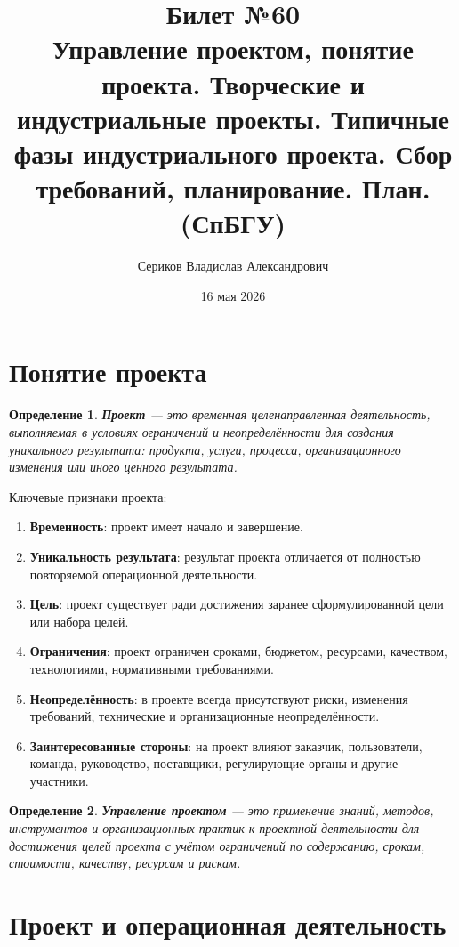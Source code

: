 \documentclass[12pt,a4paper]{article}
\title{Билет №60 \\ \small Управление проектом, понятие проекта. Творческие и индустриальные проекты. Типичные фазы индустриального проекта. Сбор требований, планирование. План. (СпБГУ)}
\author{Сериков Владислав Александрович}
\date{16 мая 2026}
\newtheorem{definition}{Определение}
\begin{document}
\maketitle
\tableofcontents
\newpage

\section{Понятие проекта}

\begin{definition}
\textbf{Проект} --- это временная целенаправленная деятельность, выполняемая в условиях ограничений и неопределённости для создания уникального результата: продукта, услуги, процесса, организационного изменения или иного ценного результата.
\end{definition}

Ключевые признаки проекта:
\begin{enumerate}
    \item \textbf{Временность}: проект имеет начало и завершение.
    \item \textbf{Уникальность результата}: результат проекта отличается от полностью повторяемой операционной деятельности.
    \item \textbf{Цель}: проект существует ради достижения заранее сформулированной цели или набора целей.
    \item \textbf{Ограничения}: проект ограничен сроками, бюджетом, ресурсами, качеством, технологиями, нормативными требованиями.
    \item \textbf{Неопределённость}: в проекте всегда присутствуют риски, изменения требований, технические и организационные неопределённости.
    \item \textbf{Заинтересованные стороны}: на проект влияют заказчик, пользователи, команда, руководство, поставщики, регулирующие органы и другие участники.
\end{enumerate}

\begin{definition}
\textbf{Управление проектом} --- это применение знаний, методов, инструментов и организационных практик к проектной деятельности для достижения целей проекта с учётом ограничений по содержанию, срокам, стоимости, качеству, ресурсам и рискам.
\end{definition}

\section{Проект и операционная деятельность}
\end{document}

